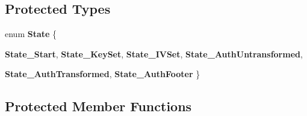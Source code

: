 \subsection*{Protected Types}
\begin{DoxyCompactItemize}
\item 
enum {\bfseries State} \{ \par
{\bfseries State\_\-Start}, 
{\bfseries State\_\-KeySet}, 
{\bfseries State\_\-IVSet}, 
{\bfseries State\_\-AuthUntransformed}, 
\par
{\bfseries State\_\-AuthTransformed}, 
{\bfseries State\_\-AuthFooter}
 \}
\end{DoxyCompactItemize}
\subsection*{Protected Member Functions}
